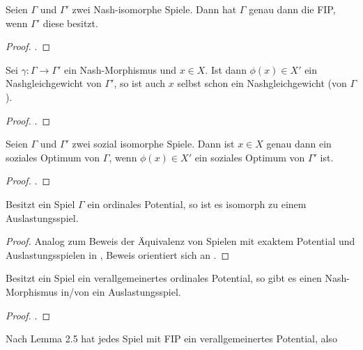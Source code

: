 \begin{lemma}
	Seien $\Gamma$ und $\Gamma'$ zwei Nash-isomorphe Spiele. Dann hat $\Gamma$ genau dann die FIP, wenn $\Gamma'$ diese besitzt.
\end{lemma}

\begin{proof}.
	
\end{proof}

\begin{lemma}
	Sei $\gamma: \Gamma \to \Gamma'$ ein Nash-Morphismus und $x \in X$. Ist dann $\phi(x) \in X'$ ein Nashgleichgewicht von $\Gamma'$, so ist auch $x$ selbst schon ein Nashgleichgewicht (von $\Gamma$).
\end{lemma}

\begin{proof}
	.
	
\end{proof}

\begin{lemma}
	Seien $\Gamma$ und $\Gamma'$ zwei sozial isomorphe Spiele. Dann ist $x \in X$ genau dann ein soziales Optimum von $\Gamma$, wenn $\phi(x) \in X'$ ein soziales Optimum von $\Gamma'$ ist.
\end{lemma}

\begin{proof}
	.
	
\end{proof}

\begin{satz}
	Besitzt ein Spiel $\Gamma$ ein ordinales Potential, so ist es isomorph zu einem Auslastungsspiel.
\end{satz}

\begin{proof}
	Analog zum Beweis der Äquivalenz von Spielen mit exaktem Potential und Auslastungsspielen in \cite{MonShap}, Beweis orientiert sich an \cite{MultiPotGames}.
\end{proof}

\begin{beob}
	Besitzt ein Spiel ein verallgemeinertes ordinales Potential, so gibt es einen Nash-Morphismus in/von  ein Auslastungsspiel.
\end{beob}

\begin{proof}
	.
\end{proof}

\begin{beob}
	Nach \cite{MonShap} Lemma 2.5 hat jedes Spiel mit FIP ein verallgemeinertes Potential, also 
\end{beob}